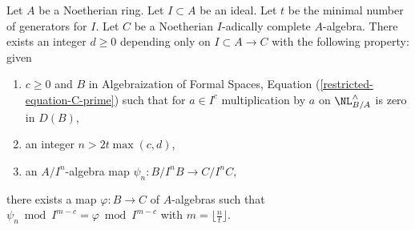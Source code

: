 \begin{lemma}
\label{lemma-get-morphism-general}
Let $A$ be a Noetherian ring. Let $I \subset A$ be an ideal.
Let $t$ be the minimal number of generators for $I$.
Let $C$ be a Noetherian $I$-adically complete $A$-algebra.
There exists an integer $d \geq 0$ depending only on
$I \subset A \to C$ with the following property: given
\begin{enumerate}
\item $c \geq 0$ and $B$ in
Algebraization of Formal Spaces, Equation (\ref{restricted-equation-C-prime})
such that for $a \in I^c$
multiplication by $a$ on $\NL_{B/A}^\wedge$ is zero in $D(B)$,
\item an integer $n > 2t\max(c, d)$,
\item an $A/I^n$-algebra map $\psi_n : B/I^nB \to C/I^nC$,
\end{enumerate}
there exists a map $\varphi : B \to C$ of $A$-algebras such
that $\psi_n \bmod I^{m - c} = \varphi \bmod I^{m - c}$
with $m = \lfloor \frac{n}{t} \rfloor$.
\end{lemma}

